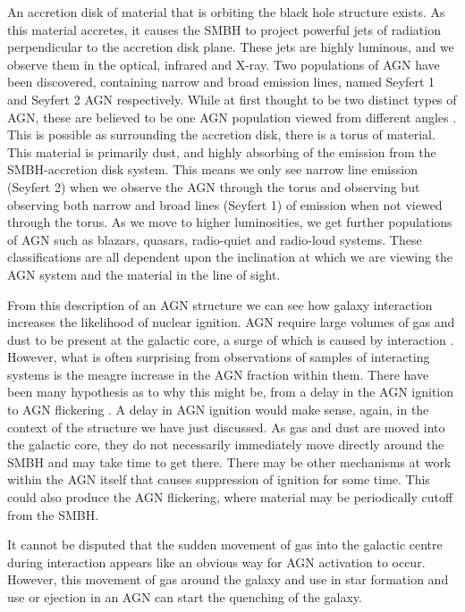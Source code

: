 An accretion disk of material that is orbiting the black hole structure exists. As this material accretes, it causes the SMBH to project powerful jets of radiation perpendicular to the accretion disk plane. These jets are highly luminous, and we observe them in the optical, infrared and X-ray. Two populations of AGN have been discovered, containing narrow and broad emission lines, named Seyfert 1 and Seyfert 2 AGN respectively. While at first thought to be two distinct types of AGN, these are believed to be one AGN population viewed from different angles \citep[for a review of the unification, see][]{2015ARA&A..53..365N}. This is possible as surrounding the accretion disk, there is a torus of material. This material is primarily dust, and highly absorbing of the emission from the SMBH-accretion disk system. This means we only see narrow line emission (Seyfert 2) when we observe the AGN through the torus and observing but observing both narrow and broad lines (Seyfert 1) of emission when not viewed through the torus. As we move to higher luminosities, we get further populations of AGN such as blazars, quasars, radio-quiet and radio-loud systems. These classifications are all dependent upon the inclination at which we are viewing the AGN system and the material in the line of sight.

From this description of an AGN structure we can see how galaxy interaction increases the likelihood of nuclear ignition. AGN require large volumes of gas and dust to be present at the galactic core, a surge of which is caused by interaction \citep[][provides an excellent summary of this process from the point of view of simulations]{2008ApJS..175..356H}. However, what is often surprising from observations of samples of interacting systems is the meagre increase in the AGN fraction within them. There have been many hypothesis as to why this might be, from a delay in the AGN ignition \citep{2011MNRAS.418.2043E} to AGN flickering \citep{2015MNRAS.451.2517S}. A delay in AGN ignition would make sense, again, in the context of the structure we have just discussed. As gas and dust are moved into the galactic core, they do not necessarily immediately move directly around the SMBH and may take time to get there. There may be other mechanisms at work within the AGN itself that causes suppression of ignition for some time. This could also produce the AGN flickering, where material may be periodically cutoff from the SMBH.

It cannot be disputed that the sudden movement of gas into the galactic centre during interaction appears like an obvious way for AGN activation to occur. However, this movement of gas around the galaxy and use in star formation and use or ejection in an AGN can start the quenching of the galaxy. 

